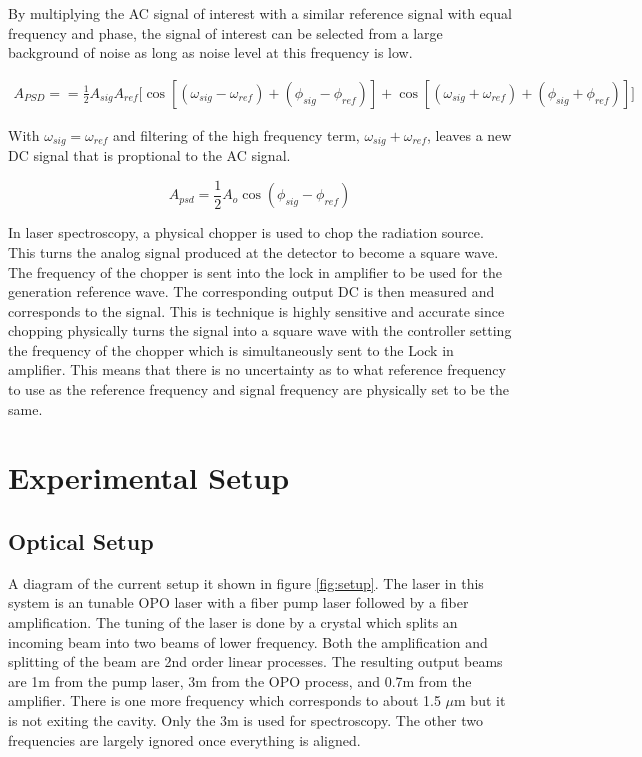 \documentclass[a4paper]{book}
\begin{document}
		By multiplying the AC signal of interest with a similar reference signal with equal frequency and phase, the signal of interest can be selected from a large background of noise as long as noise level at this frequency is low. 
		
		\begin{equation}
			\begin{split}
			A_{PSD} =
			= \frac{1}{2} A_{sig} A_{ref}\big[\cos{[(\omega_{sig}-\omega_{ref})+(\phi_{sig}-\phi_{ref})]} 
			+ \cos{[(\omega_{sig}+\omega_{ref})+(\phi_{sig}+\phi_{ref})]}\big] 
			\end{split}
			\label{eq:PSDsignal}
		\end{equation}
		
		With $\omega_{sig}=\omega_{ref}$ and filtering of the high frequency term, $\omega_{sig}+\omega_{ref}$, leaves a new DC signal that is proptional to the AC signal. \cite{LIA}
		
		\begin{equation}
			A_{psd}=\frac{1}{2} A_{o} \cos(\phi_{sig}-\phi_{ref})
			\label{eq:PSDDC}
		\end{equation}
		
		In laser spectroscopy, a physical chopper is used to chop the radiation source. This turns the analog signal produced at the detector to become a square wave. The frequency of the chopper is sent into the lock in amplifier to be used for the generation reference wave. The corresponding output DC is then measured and corresponds to the signal. This is technique is highly sensitive and accurate since chopping physically turns the signal into a square wave with the controller setting the frequency of the chopper which is simultaneously sent to the Lock in amplifier. This means that there is no uncertainty as to what reference frequency to use as the reference frequency and signal frequency are physically set to be the same.
		

\chapter{Experimental Setup}

	\section{Optical Setup}
		A diagram of the current setup it shown in figure \ref{fig:setup}.
		The laser in this system is an tunable OPO laser with a fiber pump laser followed by a fiber amplification. The tuning of the laser is done by a crystal which splits an incoming beam into two beams of lower frequency. Both the amplification and splitting  of the beam are 2nd order linear processes. 
		The resulting output beams are 1\text{$\mu$}m from the pump laser, 3\text{$\mu$}m from the OPO process, and 0.7\text{$\mu$}m from the amplifier. There is one more frequency which corresponds to about 1.5 $\mu$m but it is not exiting the cavity. Only the 3\text{$\mu$}m  is used for spectroscopy. The other two frequencies are largely ignored once everything is aligned. 
		
\end{document}
